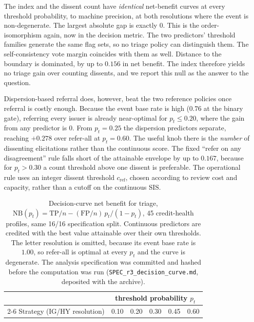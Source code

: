 \documentclass[a4paper,fleqn]{cas-sc}
\begin{document}
The index and the dissent count have \emph{identical} net-benefit curves at every threshold
probability, to machine precision, at both resolutions where the event is non-degenerate. The
largest absolute gap is exactly $0$. This is the order-isomorphism again, now in the decision metric. The two predictors' threshold families generate the same flag sets, so no triage policy can
distinguish them. The self-consistency vote margin coincides with them as well. Distance to the
boundary is dominated, by up to $0.156$ in net benefit. The index therefore yields no triage gain
over counting dissents, and we report this null as the answer to the question.

Dispersion-based referral does, however, beat the two reference policies once referral is costly
enough. Because the event base rate is high ($0.76$ at the binary gate), referring every issuer is
already near-optimal for $p_t\le0.20$, where the gain from any predictor is $0$. From $p_t=0.25$ the
dispersion predictors separate, reaching $+0.278$ over refer-all at $p_t=0.60$. The useful knob there
is the \emph{number} of dissenting elicitations rather than the continuous score. The fixed ``refer on
any disagreement'' rule falls short of the attainable envelope by up to $0.167$, because for
$p_t>0.30$ a count threshold above one dissent is preferable. The operational rule uses an integer dissent threshold $c_{\mathrm{ref}}$, chosen according to review cost and capacity, rather than a cutoff on the continuous $\mathrm{SIS}$.

\begin{table}[t]\centering
\caption{Decision-curve net benefit for triage, $\mathrm{NB}(p_t)=\mathrm{TP}/n-(\mathrm{FP}/n)
\,p_t/(1-p_t)$, 45 credit-health profiles, same 16/16 specification split. Continuous predictors are credited with
the best value attainable over their own thresholds. The letter resolution is omitted, because its event base rate is $1.00$, so refer-all is optimal at every $p_t$ and the curve is degenerate. The analysis
specification was committed and hashed before the computation was run
(\texttt{SPEC\_r3\_decision\_curve.md}, deposited with the archive).}
\label{tab:sisdca}
\begin{tabular}{lccccc}\toprule
& \multicolumn{5}{c}{threshold probability $p_t$} \\\cmidrule(l){2-6}
Strategy (IG/HY resolution) & 0.10 & 0.20 & 0.30 & 0.45 & 0.60 \\\midrule%

\end{tabular}\end{table}
\end{document}
